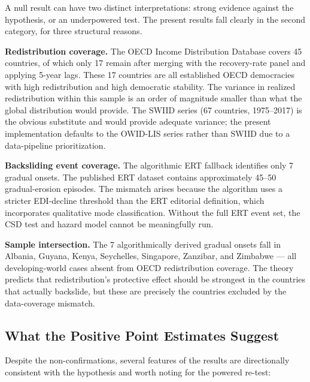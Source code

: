 \documentclass[11pt,letterpaper]{article}
\begin{document}
A null result can have two distinct interpretations: strong evidence against the hypothesis, or an underpowered test.
The present results fall clearly in the second category, for three structural reasons.

\textbf{Redistribution coverage.} The OECD Income Distribution Database covers 45 countries, of which only 17 remain
after merging with the recovery-rate panel and applying 5-year lags. These 17 countries are all established OECD
democracies with high redistribution and high democratic stability. The variance in realized redistribution within this
sample is an order of magnitude smaller than what the global distribution would provide. The SWIID series (67 countries,
1975--2017) \citep{Solt2019} is the obvious substitute and would provide adequate variance; the present implementation
defaults to the OWID-LIS series rather than SWIID due to a data-pipeline prioritization.

\textbf{Backsliding event coverage.} The algorithmic ERT fallback identifies only 7 gradual onsets. The published ERT
dataset \citep{Maerz2024} contains approximately 45--50 gradual-erosion episodes. The mismatch arises because the
algorithm uses a stricter EDI-decline threshold than the ERT editorial definition, which incorporates qualitative mode
classification. Without the full ERT event set, the CSD test and hazard model cannot be meaningfully run.

\textbf{Sample intersection.} The 7 algorithmically derived gradual onsets fall in Albania, Guyana, Kenya, Seychelles,
Singapore, Zanzibar, and Zimbabwe --- all developing-world cases absent from OECD redistribution coverage. The theory
predicts that redistribution's protective effect should be strongest in the countries that actually backslide, but these
are precisely the countries excluded by the data-coverage mismatch.

\subsection{What the Positive Point Estimates Suggest}

Despite the non-confirmations, several features of the results are directionally consistent with the hypothesis and
worth noting for the powered re-test:
\end{document}
